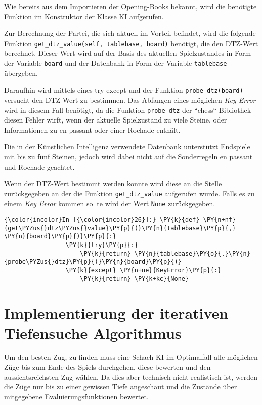     Wie bereits aus dem Importieren der Opening-Books bekannt, wird die
benötigte Funktion im Konstruktor der Klasse KI aufgerufen.

    Zur Berechnung der Partei, die sich aktuell im Vorteil befindet, wird die
folgende Funktion \texttt{get\_dtz\_value(self,\ tablebase,\ board)}
benötigt, die den DTZ-Wert berechnet. Dieser Wert wird auf der Basis des
aktuellen Spielzustandes in Form der Variable \texttt{board} und der
Datenbank in Form der Variable \texttt{tablebase} übergeben.

Daraufhin wird mittels eines try-except und der Funktion
\texttt{probe\_dtz(board)} versucht den DTZ Wert zu bestimmen. Das
Abfangen eines möglichen \emph{Key Error} wird in diesem Fall benötigt,
da die Funktion \texttt{probe\_dtz} der ``chess`` Bibliothek diesen Fehler
wirft, wenn der aktuelle Spielzustand zu viele Steine, oder
Informationen zu en passant oder einer Rochade enthält.

Die in der Künstlichen Intelligenz verwendete Datenbank unterstützt
Endspiele mit bis zu fünf Steinen, jedoch wird dabei nicht auf die
Sonderregeln en passant und Rochade geachtet.

Wenn der DTZ-Wert bestimmt werden konnte wird diese an die Stelle
zurückgegeben an der die Funktion \texttt{get\_dtz\_value} aufgerufen
wurde. Falls es zu einem \emph{Key Error} kommen sollte wird der Wert
\texttt{None} zurückgegeben.

    \begin{Verbatim}[commandchars=\\\{\}]
{\color{incolor}In [{\color{incolor}26}]:} \PY{k}{def} \PY{n+nf}{get\PYZus{}dtz\PYZus{}value}\PY{p}{(}\PY{n}{tablebase}\PY{p}{,} \PY{n}{board}\PY{p}{)}\PY{p}{:}
                 \PY{k}{try}\PY{p}{:}
                     \PY{k}{return} \PY{n}{tablebase}\PY{o}{.}\PY{n}{probe\PYZus{}dtz}\PY{p}{(}\PY{n}{board}\PY{p}{)}
                 \PY{k}{except} \PY{n+ne}{KeyError}\PY{p}{:}
                     \PY{k}{return} \PY{k+kc}{None}
\end{Verbatim}

    \section{Implementierung der iterativen Tiefensuche
Algorithmus}\label{implementierung-des-iterative-deepening-algorithmus}

Um den besten Zug, zu finden muss eine Schach-KI im Optimalfall alle
möglichen Züge bis zum Ende des Spiels durchgehen, diese bewerten und
den aussichtsreichsten Zug wählen. Da dies aber technisch nicht
realistisch ist, werden die Züge nur
bis zu einer gewissen Tiefe angeschaut und die Zustände über mitgegebene
Evaluierungsfunktionen bewertet.

